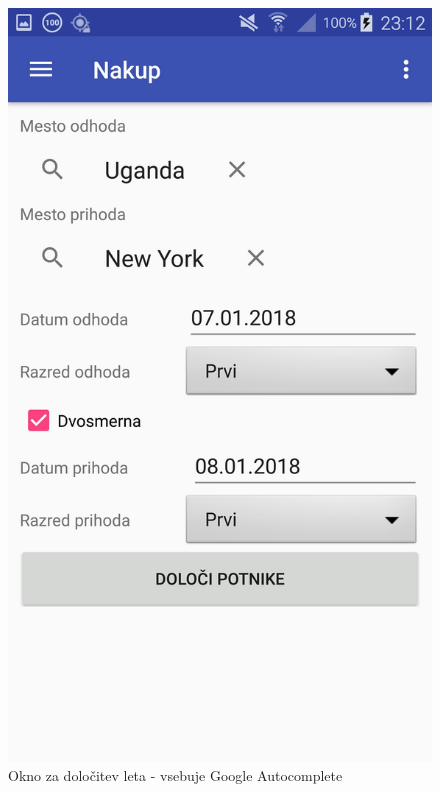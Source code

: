 \documentclass[11pt,a4paper]{article}
\begin{document}
\begin{figure}[htb]
	\centerline{\includegraphics[width=1.0\textwidth]{GUI/nakup.jpg}}
	\caption{Okno za določitev leta - vsebuje Google Autocomplete}
	\label{sl:koncept}
\end{figure}
\end{document}
